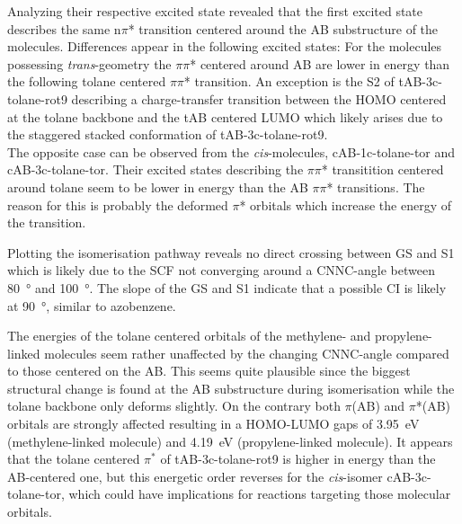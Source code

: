Analyzing their respective excited state revealed that the first excited state describes the same n$\pi$* transition centered around the AB substructure of the molecules. Differences appear in the following excited states: For the molecules possessing \textit{trans}-geometry the $\pi\pi$* centered around AB are lower in energy than the following tolane centered $\pi\pi$* transition. An exception is the S2 of tAB-3c-tolane-rot9 describing a charge-transfer transition between the HOMO centered at the tolane backbone and the tAB centered LUMO which likely arises due to the staggered stacked conformation of tAB-3c-tolane-rot9. \\
The opposite case can be observed from the \textit{cis}-molecules, cAB-1c-tolane-tor and cAB-3c-tolane-tor. Their excited states describing the $\pi\pi$* transitition centered around tolane seem to be lower in energy than the AB $\pi\pi$* transitions. The reason for this is probably the deformed $\pi$* orbitals which increase the energy of the transition. 
%
%
\begin{comment}
- tAB-1c-tolane:
-quite similar to the tAB and tolane transitions
-intensity of pi pi AB stark reduced
-S1 n pi AB
-S2 pi pi AB
-S6 pi pi tol

-tAB-3c-tolane:
-quite similar to tAB-tolane transitions overall
-intensity of pi pi AB stark reduced
-S1 n pi AB
-S2 pi(tol) pi(AB) charge transfer
-S3 pi pi AB
-S6 pi pi tol

-cAB-1c-tolane
-S1 n pi AB
-S2 pi pi tol
-S3 pi pi AB

-cAB-3c-tolane
-S1 n pi AB
-s2 pi pi tol
-s3 pi pi AB
-no CT transition

- tAB 1c + 3c: pi(AB) pi*(AB) mainly lower excited states; pi(tol) pi*(tol) higher exc. states 
- cAB 1c + 3c: pi  
\end{comment}
%
Plotting the isomerisation pathway reveals no direct crossing between GS and S1 which is likely due to the SCF not converging around a CNNC-angle between \SI{80}{\degree} and \SI{100}{\degree}. The slope of the GS and S1 indicate that a possible CI is likely at \SI{90}{\degree}, similar to azobenzene.
%
\begin{comment}
-no direct crossing observed but that is mainly due to the SCF not converging around a CNNC angle between 80 and 100 deg
-slope of the GS and S1 indicate that the possible CI is likely around 90 deg, similar to AB
\end{comment}
%
The energies of the tolane centered orbitals of the methylene- and propylene-linked molecules seem rather unaffected by the changing CNNC-angle compared to those centered on the AB. This seems quite plausible since the biggest structural change is found at the AB substructure during isomerisation while the tolane backbone only deforms slightly. On the contrary both $\pi$(AB) and $\pi$*(AB) orbitals are strongly affected resulting in a HOMO-LUMO gaps of \SI{3.95}{\eV} (methylene-linked molecule) and \SI{4.19}{\eV} (propylene-linked molecule). It appears that the tolane centered $\pi^*$ of tAB-3c-tolane-rot9 is higher in energy than the AB-centered one, but this energetic order reverses for the \textit{cis}-isomer cAB-3c-tolane-tor, which could have implications for reactions targeting those molecular orbitals.\\
